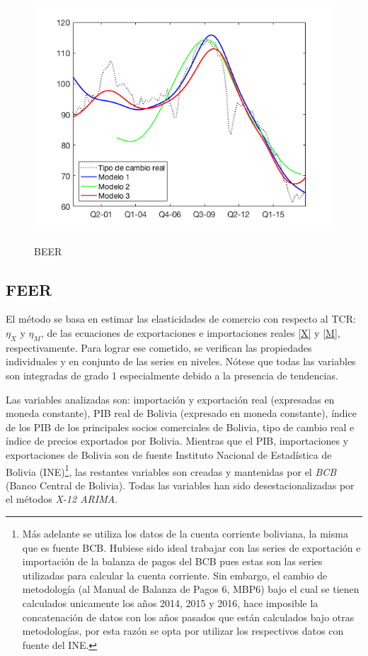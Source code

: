 \documentclass[12pt,letterpaper]{article}
\begin{document}
\begin{figure}
\centering
\caption{BEER}
\includegraphics[scale=0.6]{fig19}
\label{beergraf}
\end{figure}

\subsection*{FEER}

El método se basa en estimar las elasticidades de comercio con respecto al TCR: $\eta_X$ y $\eta_M$, de las ecuaciones de exportaciones e importaciones reales \ref{X} y \ref{M}, respectivamente. Para lograr ese cometido, se verifican las propiedades individuales y en conjunto de las series en niveles. Nótese que todas las variables son integradas de grado 1 especialmente debido a la presencia de tendencias.

Las variables analizadas son: importación y exportación real (expresadas en moneda constante), PIB real de Bolivia (expresado en moneda constante), índice de los PIB de los principales socios comerciales de Bolivia, tipo de cambio real e índice de precios exportados por Bolivia. Mientras que el PIB, importaciones y exportaciones de Bolivia son de fuente Instituto Nacional de Estadística de Bolivia (INE)\footnote{Más adelante se utiliza los datos de la cuenta corriente boliviana, la misma que es fuente BCB. Hubiese sido ideal trabajar con las series de exportación e importación de la balanza de pagos del BCB pues estas son las series utilizadas para calcular la cuenta corriente. Sin embargo, el cambio de metodología (al Manual de Balanza de Pagos 6, MBP6) bajo el cual se tienen calculados unicamente los años 2014, 2015 y 2016, hace imposible la concatenación de datos con los años pasados que están calculados bajo otras metodologías, por esta razón se opta por utilizar los respectivos datos con fuente del INE.}, las restantes variables son creadas y mantenidas por el \emph{BCB} (Banco Central de Bolivia). Todas las variables han sido desestacionalizadas por el métodos \emph{X-12 ARIMA}.
\end{document}
